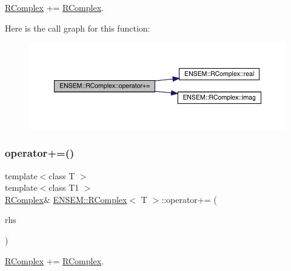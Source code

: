 \mbox{\hyperlink{classENSEM_1_1RComplex}{R\+Complex}} += \mbox{\hyperlink{classENSEM_1_1RComplex}{R\+Complex}}. 

Here is the call graph for this function\+:
\nopagebreak
\begin{figure}[H]
\begin{center}
\leavevmode
\includegraphics[width=350pt]{d9/d0e/classENSEM_1_1RComplex_aca53957ad00d064844898e907e6f6fab_cgraph}
\end{center}
\end{figure}
\mbox{\label{classENSEM_1_1RComplex_aca53957ad00d064844898e907e6f6fab}} 
\subsubsection{\texorpdfstring{operator+=()}{operator+=()}\hspace{0.1cm}{\footnotesize\ttfamily [4/4]}}
{\footnotesize\ttfamily template$<$class T $>$ \\
template$<$class T1 $>$ \\
\mbox{\hyperlink{classENSEM_1_1RComplex}{R\+Complex}}\& \mbox{\hyperlink{classENSEM_1_1RComplex}{E\+N\+S\+E\+M\+::\+R\+Complex}}$<$ T $>$\+::operator+= (\begin{DoxyParamCaption}\item[{const \mbox{\hyperlink{classENSEM_1_1RComplex}{R\+Complex}}$<$ T1 $>$ \&}]{rhs }\end{DoxyParamCaption})\hspace{0.3cm}{\ttfamily [inline]}}



\mbox{\hyperlink{classENSEM_1_1RComplex}{R\+Complex}} += \mbox{\hyperlink{classENSEM_1_1RComplex}{R\+Complex}}. 

